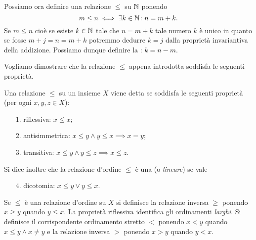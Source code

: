 Possiamo ora definire una relazione $\le$ su $\mathbb N$ ponendo 
\[
  m \le n \iff \exists k\in \mathbb N\colon n = m+k.  
\]
Se $m\le n$ cioè se esiste $k\in \mathbb N$ tale che $n=m+k$ tale numero 
$k$ è unico in quanto se fosse $m+j=n=m+k$ potremmo dedurre $k=j$
dalla proprietà invariantiva della addizione. 
Possiamo dunque definire la : $k=n-m$.


Vogliamo dimostrare che la relazione $\le$ appena introdotta soddisfa 
le seguenti proprietà.

\begin{definition}
  \label{def:ordine}%
  Una relazione
  $\le$ su un insieme $X$ viene detta
  se soddisfa le seguenti proprietà (per ogni $x,y,z\in X$):
  \begin{enumerate}
    \item[1.] riflessiva: $x\le x$;
    \item[2.] antisimmetrica: $x\le y \land y\le x \implies x=y$;
    \item[3.] transitiva: $x\le y \land y\le z \implies x\le z$.
  \end{enumerate}
  Si dice inoltre che la relazione d'ordine $\le$
  è una  (o \emph{lineare}) 
  se vale
  \begin{enumerate}
    \item[4.] dicotomia: $x\le y \lor y\le x$.
  \end{enumerate}
\end{definition}

Se $\le$ è una relazione d'ordine su $X$ si definisce la 
relazione inversa $\ge$ ponendo $x\ge y$ quando $y\le x$.
La proprietà riflessiva identifica gli ordinamenti \emph{larghi}.
Si definisce il corrispondente ordinamento stretto $<$
ponendo $x < y$ quando $x\le y \land x\neq y$
e la relazione inversa $>$ ponendo $x>y$ quando $y<x$.
  
